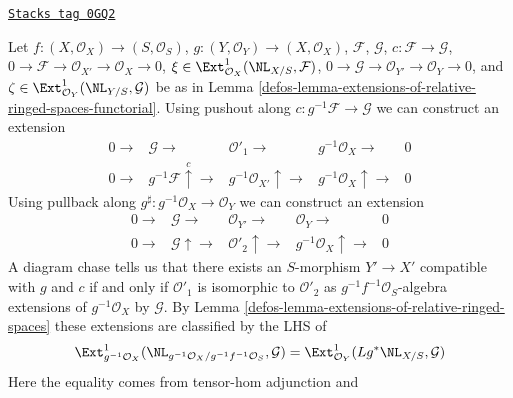 \begin{remark}
\label{defos-remark-extensions-of-relative-ringed-spaces-functorial}
\href{https://stacks.math.columbia.edu/tag/0GQ2}{\texttt{Stacks tag 0GQ2}}

Let $f : (X, \mathcal{O}_X) \to (S, \mathcal{O}_S)$,
$g : (Y, \mathcal{O}_Y) \to (X, \mathcal{O}_X)$,
$\mathcal{F}$,
$\mathcal{G}$,
$c : \mathcal{F} \to \mathcal{G}$,
$0 \to \mathcal{F} \to \mathcal{O}_{X'} \to \mathcal{O}_X \to 0$,
$\xi \in \Ext^1_{\mathcal{O}_X}(\NL_{X/S}, \mathcal{F})$,
$0 \to \mathcal{G} \to \mathcal{O}_{Y'} \to \mathcal{O}_Y \to 0$,
and $\zeta \in \Ext^1_{\mathcal{O}_Y}(\NL_{Y/S}, \mathcal{G})$
be as in Lemma \ref{defos-lemma-extensions-of-relative-ringed-spaces-functorial}.
Using pushout along $c : g^{-1}\mathcal{F} \to \mathcal{G}$
we can construct an extension
$$
\begin{array}{ccccc}0 \longrightarrow & \mathcal{G} \longrightarrow & \mathcal{O}'_1 \longrightarrow & g^{-1}\mathcal{O}_X \longrightarrow & 0 \\ 0 \longrightarrow & g^{-1}\mathcal{F} \overset{c}{\uparrow}\longrightarrow & g^{-1}\mathcal{O}_{X'} \uparrow\longrightarrow & g^{-1}\mathcal{O}_X \uparrow\longrightarrow & 0\end{array}
$$
Using pullback along
$g^\sharp : g^{-1}\mathcal{O}_X \to \mathcal{O}_Y$
we can construct an extension
$$
\begin{array}{ccccc}0 \longrightarrow & \mathcal{G} \longrightarrow & \mathcal{O}_{Y'} \longrightarrow & \mathcal{O}_Y \longrightarrow & 0 \\ 0 \longrightarrow & \mathcal{G} \uparrow\longrightarrow & \mathcal{O}'_2 \uparrow\longrightarrow & g^{-1}\mathcal{O}_X \uparrow\longrightarrow & 0\end{array}
$$
A diagram chase tells us that there exists an $S$-morphism $Y' \to X'$
compatible with $g$ and $c$ if and only if $\mathcal{O}'_1$ is isomorphic
to $\mathcal{O}'_2$ as $g^{-1}f^{-1}\mathcal{O}_S$-algebra extensions
of $g^{-1}\mathcal{O}_X$ by $\mathcal{G}$. By
Lemma \ref{defos-lemma-extensions-of-relative-ringed-spaces}
these extensions are classified by the LHS of
$$
\Ext^1_{g^{-1}\mathcal{O}_X}(
\NL_{g^{-1}\mathcal{O}_X/g^{-1}f^{-1}\mathcal{O}_S}, \mathcal{G}) =
\Ext^1_{\mathcal{O}_Y}(Lg^*\NL_{X/S}, \mathcal{G})
$$
Here the equality comes from tensor-hom adjunction and

\end{remark}
